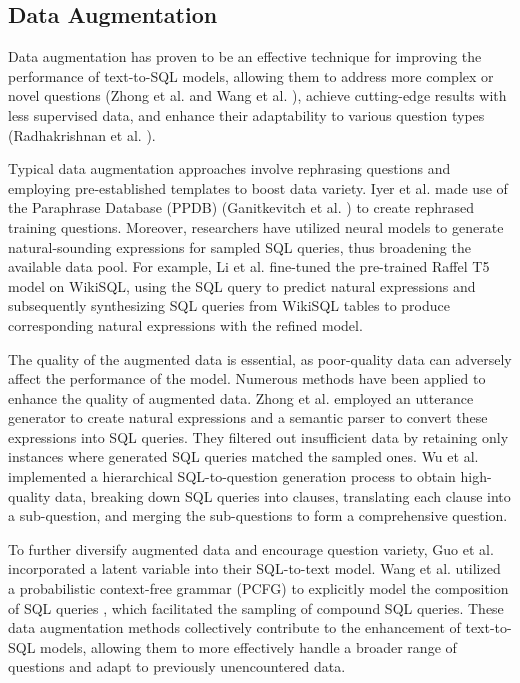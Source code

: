 \subsection{Data Augmentation}
\label{sec:augmentation}

Data augmentation has proven to be an effective technique for improving the performance of text-to-SQL models, allowing them to address more complex or novel questions (Zhong et al. \cite{zhong_semantic_2020} and Wang et al. \cite{wang_rat_sql_2021}), achieve cutting-edge results with less supervised data, and enhance their adaptability to various question types (Radhakrishnan et al. \cite{DBLP:journals/corr/abs-2010-09927}).

Typical data augmentation approaches involve rephrasing questions and employing pre-established templates to boost data variety. Iyer et al. \cite{iyer-etal-2017-learning} made use of the Paraphrase Database (PPDB) (Ganitkevitch et al. \cite{ganitkevitch-etal-2013-ppdb}) to create rephrased training questions. Moreover, researchers have utilized neural models to generate natural-sounding expressions for sampled SQL queries, thus broadening the available data pool. For example, Li et al. \cite{raffel_exploring_2020} fine-tuned the pre-trained Raffel T5 model \cite{raffel_exploring_2020} on WikiSQL, using the SQL query to predict natural expressions and subsequently synthesizing SQL queries from WikiSQL tables to produce corresponding natural expressions with the refined model.

The quality of the augmented data is essential, as poor-quality data can adversely affect the performance of the model\cite{DBLP:journals/corr/abs-2009-13845}. Numerous methods have been applied to enhance the quality of augmented data. Zhong et al. \cite{zhong_semantic_2020} employed an utterance generator to create natural expressions and a semantic parser to convert these expressions into SQL queries. They filtered out insufficient data by retaining only instances where generated SQL queries matched the sampled ones. Wu et al. \cite{DBLP:journals/corr/abs-2009-13845} implemented a hierarchical SQL-to-question generation process to obtain high-quality data, breaking down SQL queries into clauses, translating each clause into a sub-question, and merging the sub-questions to form a comprehensive question.

To further diversify augmented data and encourage question variety, Guo et al. \cite{DBLP:journals/corr/abs-1905-08205} incorporated a latent variable into their SQL-to-text model. Wang et al. utilized a probabilistic context-free grammar (PCFG) to explicitly model the composition of SQL queries \cite{yang-etal-2021-pcfgs}, which facilitated the sampling of compound SQL queries. These data augmentation methods collectively contribute to the enhancement of text-to-SQL models, allowing them to more effectively handle a broader range of questions and adapt to previously unencountered data.